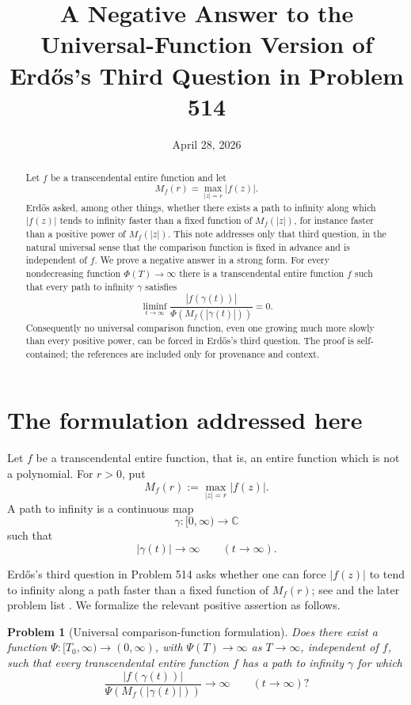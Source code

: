 \documentclass[11pt]{article}
\title{A Negative Answer to the Universal-Function Version of Erd\H{o}s's Third Question in Problem 514}
\author{}
\date{April 28, 2026}
\newtheorem{problem}{Problem}
\newcommand{\C}{\mathbb C}
\begin{document}
\maketitle

\begin{abstract}
Let \(f\) be a transcendental entire function and let
\[
M_f(r)=\max_{|z|=r}|f(z)|.
\]
Erd\H{o}s asked, among other things, whether there exists a path to infinity
along which \(|f(z)|\) tends to infinity faster than a fixed function of
\(M_f(|z|)\), for instance faster than a positive power of \(M_f(|z|)\).
This note addresses only that third question, in the natural universal sense
that the comparison function is fixed in advance and is independent of \(f\).
We prove a negative answer in a strong form.  For every nondecreasing function
\(\Phi(T)\to\infty\) there is a transcendental entire function \(f\) such that
every path to infinity \(\gamma\) satisfies
\[
\liminf_{t\to\infty}
\frac{|f(\gamma(t))|}{\Phi(M_f(|\gamma(t)|))}=0.
\]
Consequently no universal comparison function, even one growing much more
slowly than every positive power, can be forced in Erd\H{o}s's third question.
The proof is self-contained; the references are included only for provenance
and context.
\end{abstract}

\section{The formulation addressed here}

Let \(f\) be a transcendental entire function, that is, an entire function
which is not a polynomial.  For \(r>0\), put
\[
M_f(r):=\max_{|z|=r}|f(z)|.
\]
A path to infinity is a continuous map
\[
\gamma:[0,\infty)\to\C
\]
such that
\[
|\gamma(t)|\to\infty \qquad (t\to\infty).
\]

Erd\H{o}s's third question in Problem 514 asks whether one can force
\(|f(z)|\) to tend to infinity along a path faster than a fixed function of
\(M_f(r)\); see \cite[p. 249]{Erdos1961} and the later problem list
\cite{Erdos1982}.  We formalize the relevant positive assertion as follows.

\begin{problem}[Universal comparison-function formulation]
Does there exist a function \(\Psi:[T_0,\infty)\to(0,\infty)\), with
\(\Psi(T)\to\infty\) as \(T\to\infty\), independent of \(f\), such that every
transcendental entire function \(f\) has a path to infinity \(\gamma\) for which
\[
\frac{|f(\gamma(t))|}{\Psi(M_f(|\gamma(t)|))}\to\infty
\qquad (t\to\infty)?
\]
\end{problem}
\end{document}
